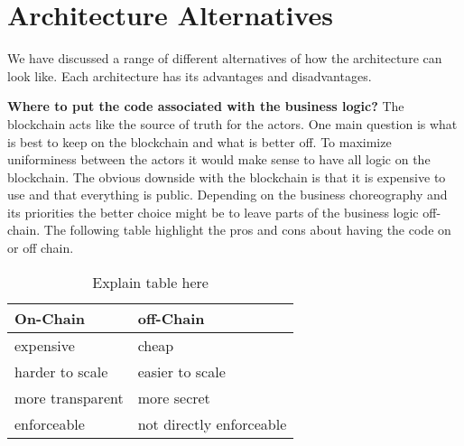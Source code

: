\documentclass[runningheads]{llncs}
\begin{document}
\begin{comment}
This process is distributed (no third party needed) and requires no trust. Also the blockchain is only used as storage and there are no cryptographic operations done on-chain, so the operations are (hopefully) affordable.

\textbf{further thoughts:} Since we can view the PB as a state-machine, every state change must be posted to the chain. We can do this with the process described above. State changes have to be reflected on client side. 

\textbf{questions}: Things I am not sure about, that I would like to talk about
\begin{itemize}
    \item Do we need some sort of consensus protocol to make sure that all clients are in the same state?
    \item How do we convert a BPM into code? Are the assumptions correct?
    \item  Is the ideal solution really the ideal solution? 
    \item Does the encryption idea make any sens?
    \item Is there a better way to enforce that the correct program is being executed on client side?
\end{itemize}


\end{comment}


\section{Architecture Alternatives}
We have discussed a range of different alternatives of how the architecture can look like. Each architecture has its advantages and disadvantages.

\textbf{Where to put the code associated with the business logic?}
The blockchain acts like the source of truth for the actors. One main question is what is best to keep on the blockchain and what is better off. To maximize uniforminess between the actors it would make sense to have all logic on the blockchain. The obvious downside with the blockchain is that it is expensive to use and that everything is public. Depending on the business choreography and its priorities the better choice might be to leave parts of the business logic off-chain. The following table highlight the pros and cons about having the code on or off chain.

\begin{table*}[t]
  \centering
  \begin{tabular}{p{6cm}p{6cm}}
  \hline
    \textbf{On-Chain} & \textbf{off-Chain}\\
    \hline \hline
    
 expensive & cheap \\
     harder to scale & easier to scale \\
     more transparent & more secret \\
     enforceable & not directly enforceable \\

\hline
  \end{tabular}
  \caption{Explain table here}
  \label{tab:1}
\end{table*}
\end{document}
